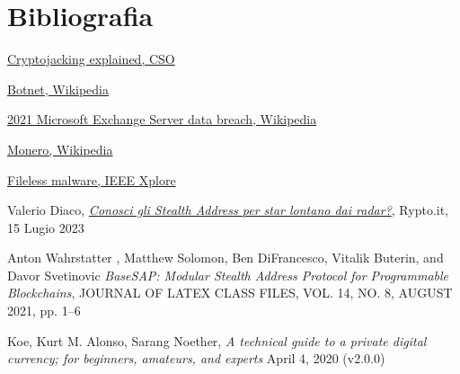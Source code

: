 \documentclass[12pt,a4paper]{article}
\begin{document}
\section{Bibliografia}
\begin{thebibliography}{9}

\href{https://arc.net/l/quote/karbftmg}{Cryptojacking explained, CSO}

\href{https://arc.net/l/quote/ftyxgxms}{Botnet, Wikipedia}

\href{https://arc.net/l/quote/golshtco}{2021 Microsoft Exchange Server data breach, Wikipedia}

\href{https://arc.net/l/quote/jffmkeln}{Monero, Wikipedia}

\href{https://arc.net/l/quote/kbarlqni}{Fileless malware, IEEE Xplore}

Valerio Diaco, \href{https://arc.net/l/quote/qirrmtbh}{\textit{Conosci gli
Stealth Address per star lontano dai radar?}}, Rypto.it, 15 Lugio 2023

Anton Wahrstatter , Matthew Solomon, Ben DiFrancesco, Vitalik Buterin, and Davor
Svetinovic \textit{BaseSAP: Modular Stealth Address Protocol for Programmable
Blockchains}, JOURNAL OF LATEX CLASS FILES, VOL. 14, NO. 8, AUGUST 2021, pp. 1–6

Koe, Kurt M. Alonso, Sarang Noether, \textit{A technical guide to a private
digital currency; for beginners, amateurs, and experts} April 4, 2020 (v2.0.0)


\end{thebibliography}
\end{document}
